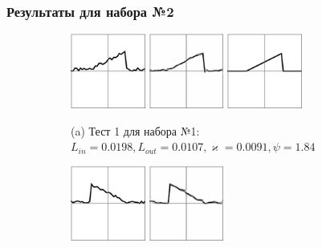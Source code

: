 \documentclass{beamer}
\renewcommand{\kappa}{\varkappa}
\begin{document}
\begin{frame}
	\frametitle{Результаты для набора №2}
	\vspace{-1em}
	\begin{figure}[!hp]
		\centering
		\begin{subfigure}{\textwidth}
			\centering
			\includegraphics[width=0.27\textwidth]{res_n1_1}
			\hfill
			\includegraphics[width=0.27\textwidth]{res_n2_2}
			\hfill
			\includegraphics[width=0.27\textwidth]{1}
			\caption*{\small (a) Тест 1 для набора №1: 
				$L_{in} = 0.0198,
				L_{out} = 0.0107, 
				\kappa = 0.0091,
				\psi = 1.84
				$}
		\end{subfigure}
		\vspace{-1em}
		\begin{subfigure}{\textwidth}
			\centering
			\includegraphics[width=0.27\textwidth]{res_n1_3}
			\hfill
			\includegraphics[width=0.27\textwidth]{res_n2_4}

\end{subfigure}
\end{figure}
\end{frame}
\end{document}
